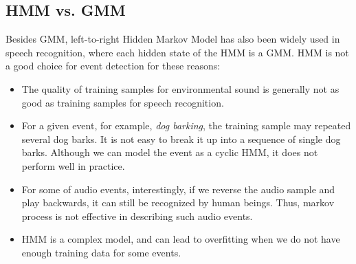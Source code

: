 \subsection{HMM vs. GMM}
Besides GMM, left-to-right Hidden Markov Model has also been widely
used in speech recognition, where each hidden state of the HMM is a GMM.
HMM is not a good choice for event detection for these reasons:
\begin{itemize}
\item The quality of training samples for environmental sound
is generally not as good as training samples for speech recognition.
\item For a given event, for example, {\em dog barking},
the training sample may repeated several dog barks.
It is not easy to break it up into a sequence of single dog barks.
Although we can model the event as a cyclic HMM,
it does not perform well in practice.
\item For some of audio events, interestingly, if we reverse the audio
sample and play backwards, it can still be recognized by human beings.
Thus, markov process is not effective in describing such audio events.
\item HMM is a complex model, and can lead to overfitting when we do not
have enough training data for some events.
\end{itemize}

